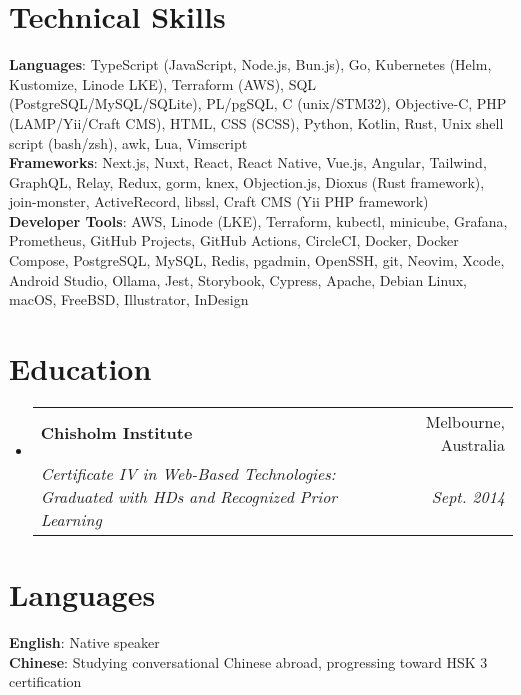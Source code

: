 \documentclass[letterpaper,11pt]{article}
\makeatletter
\newcommand{\resumeSubheading}[4]{
  \vspace{-2pt}\item
    \begin{tabular*}{0.97\textwidth}[t]{l@{\extracolsep{\fill}}r}
      \textbf{#1} & #2 \\
      \textit{\small#3} & \textit{\small #4} \\
    \end{tabular*}\vspace{-7pt}
}
\newcommand{\resumeSubHeadingListStart}{\begin{itemize}[leftmargin=0.15in, label={}]}
\newcommand{\resumeSubHeadingListEnd}{\end{itemize}}
\makeatother
\begin{document}
\section{Technical Skills}
 \begin{itemize}[leftmargin=0.15in, label={}]
    \small{\item{
     \textbf{Languages}{: TypeScript (JavaScript, Node.js, Bun.js), Go, Kubernetes (Helm, Kustomize, Linode LKE), Terraform (AWS), SQL (PostgreSQL/MySQL/SQLite), PL/pgSQL, C (unix/STM32), Objective-C, PHP (LAMP/Yii/Craft CMS), HTML, CSS (SCSS), Python, Kotlin, Rust, Unix shell script (bash/zsh), awk, Lua, Vimscript} \\
     \textbf{Frameworks}{: Next.js, Nuxt, React, React Native, Vue.js, Angular, Tailwind, GraphQL, Relay, Redux, gorm, knex, Objection.js, Dioxus (Rust framework), join-monster, ActiveRecord, libssl, Craft CMS (Yii PHP framework)} \\
     \textbf{Developer Tools}{: AWS, Linode (LKE), Terraform, kubectl, minicube, Grafana, Prometheus, GitHub Projects, GitHub Actions, CircleCI, Docker, Docker Compose, PostgreSQL, MySQL, Redis, pgadmin, OpenSSH, git, Neovim, Xcode, Android Studio, Ollama, Jest, Storybook, Cypress, Apache, Debian Linux, macOS, FreeBSD, Illustrator, InDesign} \\
    }}
 \end{itemize}

\section{Education}
\resumeSubHeadingListStart
  \resumeSubheading
    {Chisholm Institute}{Melbourne, Australia}
    {Certificate IV in Web-Based Technologies: Graduated with HDs and Recognized Prior Learning}{Sept. 2014}
\resumeSubHeadingListEnd


\section{Languages}
 \begin{itemize}[leftmargin=0.15in, label={}]
    \small{\item{
     \textbf{English}{: Native speaker} \\
     \textbf{Chinese}{: Studying conversational Chinese abroad, progressing toward HSK 3 certification} \\
    }}
 \end{itemize}
\end{document}

